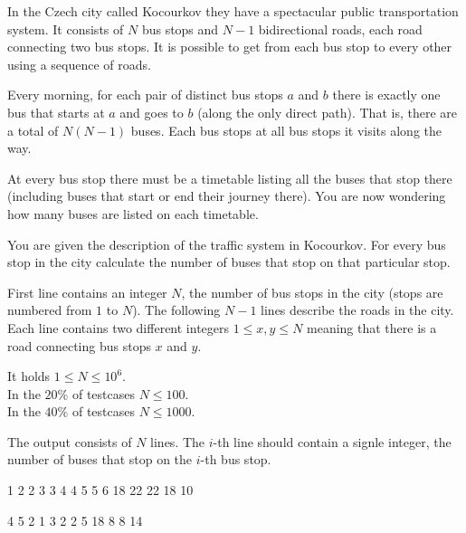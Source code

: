 





In the Czech city called Kocourkov they have a spectacular public transportation system.
It consists of $N$ bus stops and $N-1$ bidirectional roads, each road connecting two bus stops.
It is possible to get from each bus stop to every other using a sequence of roads.

Every morning, for each pair of distinct bus stops $a$ and $b$ there is exactly one bus
that starts at $a$ and goes to $b$ (along the only direct path).
That is, there are a total of $N(N-1)$ buses.
Each bus stops at all bus stops it visits along the way.

At every bus stop there must be a timetable listing all the buses that stop there (including
buses that start or end their journey there).
You are now wondering how many buses are listed on each timetable.


You are given the description of the traffic system in Kocourkov.
For every bus stop in the city calculate the number of buses that stop on that particular stop.


First line contains an integer $N$, the number of bus stops in the city (stops are numbered from $1$ to $N$).
The following $N-1$ lines describe the roads in the city.
Each line contains two different integers $1 \le x, y \le N$ meaning that there is a road connecting bus stops $x$ and $y$.

\bigskip
\noindent
It holds $1 \leq N \leq 10^6$.\\
In the $20\%$ of testcases $N \leq 100$.\\
In the $40\%$ of testcases $N \leq 1000$.


The output consists of $N$ lines. The $i$-th line should contain a signle integer, the number of buses that stop on the $i$-th bus stop.


1 2
2 3
3 4
4 5
5 6
18
22
22
18
10
\sampleEND

\bigskip

4 5
2 1
3 2
2 5
18
8
8
14
\sampleEND



